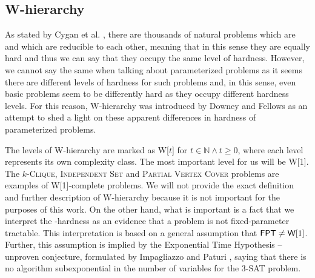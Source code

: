 \subsection{W-hierarchy}

As stated by Cygan et al. \cite[p.~423]{Cygan2015},
there are thousands of natural problems which are \NPc and which are reducible to each other,
meaning that in this sense they are equally hard and thus we can say that
they occupy the same level of hardness.
However, we cannot say the same when talking about parameterized problems as it seems there are
different levels of hardness for such problems and, in this sense, even basic problems
seem to be differently hard as they occupy different hardness levels.
For this reason, W-hierarchy was introduced by Downey and Fellows \cite{Downey1999} as
an attempt to shed a light on these apparent differences in hardness of parameterized problems. 

The levels of W-hierarchy are marked as W[$t$] for $t \in \mathbb{N} \wedge t \geq 0$,
where each level represents its own complexity class.
The most important level for us will be W[1].
The $k$-\textsc{Clique}, \textsc{Independent Set} and \textsc{Partial Vertex Cover} problems
are examples of W[1]-complete problems.
We will not provide the exact definition and further description of W-hierarchy
because it is not important for the purposes of this work.
On the other hand, what is important is a fact that we interpret the \W-hardness as an evidence that
a problem is not fixed-parameter tractable.
This interpretation is based on a general assumption that $\textsf{FPT} \neq \textsf{W}[1]$.
Further, this assumption is implied by the Exponential Time Hypothesis -- unproven conjecture,
formulated by Impagliazzo and Paturi \cite{Impagliazzo1999}, saying that there is no
algorithm subexponential in the number of variables for the $3$-\textsc{SAT} problem.

